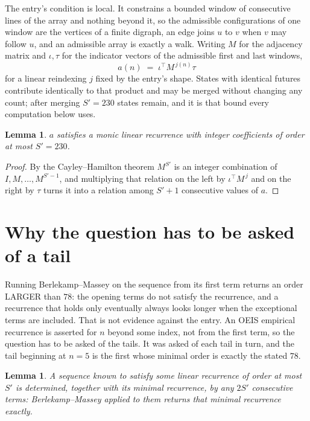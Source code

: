 \documentclass[11pt,a4paper]{article}
\theoremstyle{plain}
\newtheorem{lemma}[theorem]{Lemma}
\theoremstyle{definition}
\begin{document}
The entry's condition is local. It constrains a bounded window of consecutive lines of the
array and nothing beyond it, so the admissible configurations of one window are the vertices of
a finite digraph, an edge joins $u$ to $v$ when $v$ may follow $u$, and an admissible array is
exactly a walk. Writing $M$ for the adjacency matrix and $\iota,\tau$ for the indicator vectors
of the admissible first and last windows,
\[
a(n)\;=\;\iota^{\!\top}M^{\,j(n)}\tau
\]
for a linear reindexing $j$ fixed by the entry's shape. States with identical futures
contribute identically to that product and may be merged without changing any count; after
merging $S'=230$ states remain, and it is that bound every computation below uses.

\begin{lemma}\label{lem:cf}
$a$ satisfies a monic linear recurrence with integer coefficients of order at most $S'=230$.
\end{lemma}

\begin{proof}
By the Cayley--Hamilton theorem $M^{S'}$ is an integer combination of $I,M,\dots,M^{S'-1}$,
and multiplying that relation on the left by $\iota^{\!\top}M^{\,j}$ and on the right by
$\tau$ turns it into a relation among $S'+1$ consecutive values of $a$.
\end{proof}

\section{Why the question has to be asked of a tail}

Running Berlekamp--Massey on the sequence from its first term returns an order LARGER than $78$: the opening terms do not satisfy the recurrence, and a recurrence that holds only eventually always looks longer when the exceptional terms are included. That is not evidence against the entry. An OEIS empirical recurrence is asserted for $n$ beyond some index, not from the first term, so the question has to be asked of the tails. It was asked of each tail in turn, and the tail beginning at $n=5$ is the first whose minimal order is exactly the stated $78$.

\begin{lemma}\label{lem:bm}
A sequence known to satisfy some linear recurrence of order at most $S'$ is determined,
together with its minimal recurrence, by any $2S'$ consecutive terms: Berlekamp--Massey applied
to them returns that minimal recurrence exactly.
\end{lemma}
\end{document}
